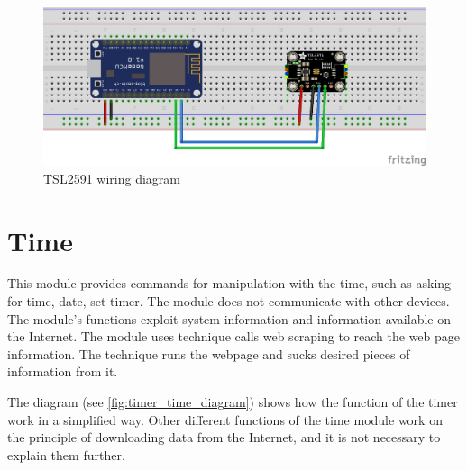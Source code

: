 \begin{figure}[H]
	\centering
	\includegraphics[width=\textwidth]{img/tsl2591_schema.png}
	\caption{TSL2591 wiring diagram}
	\label{fig:tsl2591_schema}
\end{figure}

\section{Time}

This module provides commands for manipulation with the time, such as asking for time, date, set timer. The module does not communicate with other devices. The module's functions exploit system information and information available on the Internet. The module uses technique calls web scraping to reach the web page information. The technique runs the webpage and sucks desired pieces of information from it.




The diagram (see \cref{fig:timer_time_diagram}) shows how the function of the timer work in a simplified way. Other different functions of the time module work on the principle of downloading data from the Internet, and it is not necessary to explain them further.

